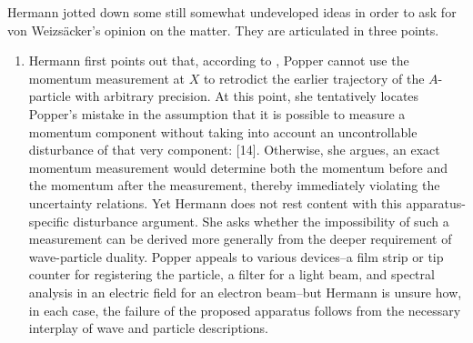 \documentclass[final,12pt]{article}
\newcommand{\vW}{von Weizsäcker\xspace}
\begin{document}
Hermann jotted down some still somewhat undeveloped ideas in order to ask for \vW's opinion on the matter. They are articulated in three points.

\begin{enumerate}
\item Hermann first points out that, according to \qm, Popper cannot use the momentum measurement at $X$ to retrodict the earlier trajectory of the $A$-particle with arbitrary precision. At this point, she tentatively locates Popper's mistake in the assumption that it is possible to measure a momentum component without taking into account an uncontrollable disturbance of that very component:  [14]. Otherwise, she argues, an exact momentum measurement would determine both the momentum before and the momentum after the measurement, thereby immediately violating the uncertainty relations. Yet Hermann does not rest content with this apparatus-specific disturbance argument. She asks whether the impossibility of such a measurement can be derived more generally from the deeper requirement of wave-particle duality. Popper appeals to various devices--a film strip or tip counter for registering the particle, a filter for a light beam, and spectral analysis in an electric field for an electron beam--but Hermann is unsure how, in each case, the failure of the proposed apparatus follows from the necessary interplay of wave and particle descriptions.


\end{enumerate}
\end{document}
